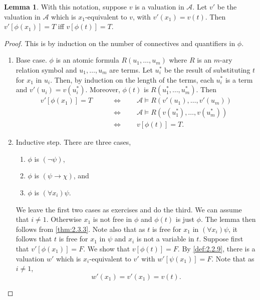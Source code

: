 \documentclass{article}
\newcommand{\rb}[1]{\left( #1 \right)}
\renewcommand{\sb}[1]{\left[ #1 \right]}
\newcommand{\notb}[1]{\rb{\neg #1}}
\newcommand{\impb}[2]{\rb{#1 \rightarrow #2}}
\newcommand{\fab}[1]{\rb{\forall #1}}
\theoremstyle{definition}\newtheorem{definition}{Definition}[subsection]
\theoremstyle{definition}\newtheorem{remark}[definition]{Remark}
\theoremstyle{definition}\newtheorem*{example}{Example}
\theoremstyle{definition}\newtheorem*{note}{Note}
\newtheorem{lemma}[definition]{Lemma}
\begin{document}
\begin{lemma}
\label{lem:2.3.7}
With this notation, suppose $ v $ is a valuation in $ \mathcal{A} $. Let $ v' $ be the valuation in $ \mathcal{A} $ which is $ x_1 $-equivalent to $ v $, with $ v'\rb{x_1} = v\rb{t} $. Then $ v'\sb{\phi\rb{x_1}} = T $ iff $ v\sb{\phi\rb{t}} = T $.
\end{lemma}

\begin{proof}
This is by induction on the number of connectives and quantifiers in $ \phi $.
\begin{enumerate}
\item Base case. $ \phi $ is an atomic formula $ R\rb{u_1, \dots, u_m} $ where $ R $ is an $ m $-ary relation symbol and $ u_1, \dots, u_m $ are terms. Let $ u^*_i $ be the result of substituting $ t $ for $ x_1 $ in $ u_i $. Then, by induction on the length of the terms, each $ u_i^* $ is a term and $ v'\rb{u_i} = v\rb{u_i^*} $. Moreover, $ \phi\rb{t} $ is $ R\rb{u_1^*, \dots, u_m^*} $. Then
\begin{align*}
v'\sb{\phi\rb{x_1}} = T \qquad
& \iff \qquad \mathcal{A} \vDash R\rb{v'\rb{u_1}, \dots, v'\rb{u_m}} \\
& \iff \qquad \mathcal{A} \vDash R\rb{v\rb{u_1^*}, \dots, v\rb{u_m^*}} \\
& \iff \qquad v\sb{\phi\rb{t}} = T.
\end{align*}
\item Inductive step. There are three cases,
\begin{enumerate}
\item $ \phi $ is $ \notb{\psi} $,
\item $ \phi $ is $ \impb{\psi}{\chi} $, and
\item $ \phi $ is $ \fab{x_i}\psi $.
\end{enumerate}
We leave the first two cases as exercises and do the third. We can assume that $ i \ne 1 $. Otherwise $ x_1 $ is not free in $ \phi $ and $ \phi\rb{t} $ is just $ \phi $. The lemma then follows from \ref{thm:2.3.3}. Note also that as $ t $ is free for $ x_1 $ in $ \fab{x_i}\psi $, it follows that $ t $ is free for $ x_1 $ in $ \psi $ and $ x_i $ is not a variable in $ t $. Suppose first that $ v'\sb{\phi\rb{x_1}} = F $. We show that $ v\sb{\phi\rb{t}} = F $. By \ref{def:2.2.9}, there is a valuation $ w' $ which is $ x_i $-equivalent to $ v' $ with $ w'\sb{\psi\rb{x_1}} = F $. Note that as $ i \ne 1 $,
\begin{equation}
\label{eq:5}
w'\rb{x_1} = v'\rb{x_1} = v\rb{t}.
\end{equation}

\end{enumerate}
\end{proof}
\end{document}
